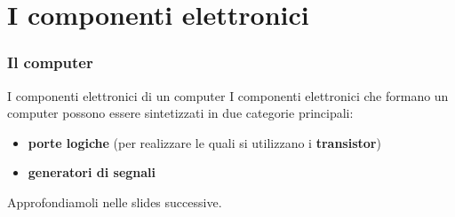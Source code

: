 \section[I componenti elettronici]{I componenti elettronici}
\label{sec:electronics}


\begin{frame}
	\frametitle{Il computer}
	
	\begin{block}{I componenti elettronici di un computer}
		I componenti elettronici che formano un computer possono essere sintetizzati in due categorie principali:
		\begin{itemize}
			\item \textbf{porte logiche} (per realizzare le quali si utilizzano i \textbf{transistor})
			\item \textbf{generatori di segnali}
		\end{itemize}
		
		Approfondiamoli nelle slides successive.
	\end{block}
\end{frame}



